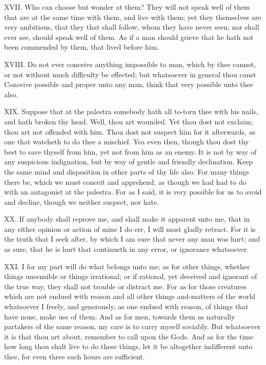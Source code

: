 XVII. Who can choose but wonder at them? They will not speak well of
them that are at the same time with them, and live with them; yet they
themselves are very ambitious, that they that shall follow, whom they have
never seen, nor shall ever see, should speak well of them. As if a man
should grieve that he hath not been commended by them, that lived before
him.

XVIII. Do not ever conceive anything impossible to man, which by thee
cannot, or not without much difficulty be effected; but whatsoever in
general thou canst Conceive possible and proper unto any man, think that
very possible unto thee also.

XIX. Suppose that at the palestra somebody hath all to-torn thee with
his nails, and hath broken thy head. Well, thou art wounded. Yet thou dost
not exclaim; thou art not offended with him. Thou dost not suspect him for
it afterwards, as one that watcheth to do thee a mischief. Yea even then,
though thou dost thy best to save thyself from him, yet not from him as an
enemy. It is not by way of any suspicious indignation, but by way of
gentle and friendly declination. Keep the same mind and disposition in
other parts of thy life also. For many things there be, which we must
conceit and apprehend, as though we had had to do with an antagonist at
the palestra. For as I said, it is very possible for us to avoid and
decline, though we neither suspect, nor hate.

XX. If anybody shall reprove me, and shall make it apparent unto me,
that in any either opinion or action of mine I do err, I will most gladly
retract. For it is the truth that I seek after, by which I am sure that
never any man was hurt; and as sure, that he is hurt that continueth in
any error, or ignorance whatsoever.

XXI. I for my part will do what belongs unto me; as for other things,
whether things unsensible or things irrational; or if rational, yet
deceived and ignorant of the true way, they shall not trouble or distract
me. For as for those creatures which are not endued with reason and all
other things and-matters of the world whatsoever I freely, and generously,
as one endued with reason, of things that have none, make use of them. And
as for men, towards them as naturally partakers of the same reason, my
care is to carry myself sociably. But whatsoever it is that thou art
about, remember to call upon the Gods. And as for the time how long thou
shalt live to do these things, let it be altogether indifferent unto thee,
for even three such hours are sufficient.

